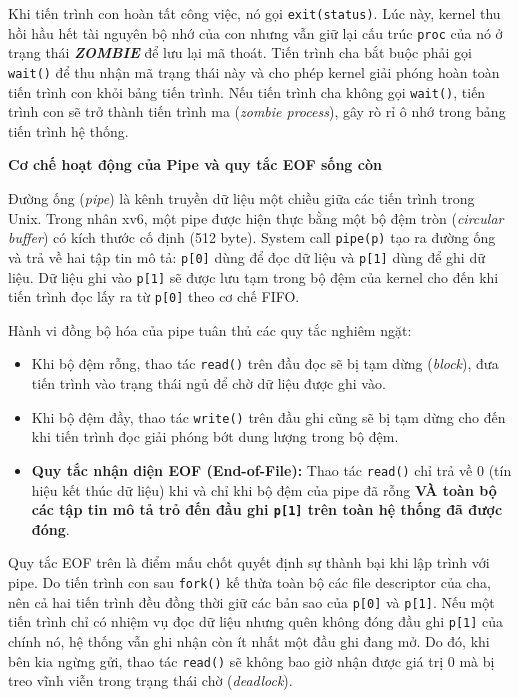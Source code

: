 \documentclass[12pt,a4paper]{article}
\begin{document}
Khi tiến trình con hoàn tất công việc, nó gọi \texttt{exit(status)}. Lúc này, kernel thu hồi hầu hết tài nguyên bộ nhớ của con nhưng vẫn giữ lại cấu trúc \texttt{proc} của nó ở trạng thái \textbf{\textit{ZOMBIE}} để lưu lại mã thoát. Tiến trình cha bắt buộc phải gọi \texttt{wait()} để thu nhận mã trạng thái này và cho phép kernel giải phóng hoàn toàn tiến trình con khỏi bảng tiến trình. Nếu tiến trình cha không gọi \texttt{wait()}, tiến trình con sẽ trở thành tiến trình ma (\textit{zombie process}), gây rò rỉ ô nhớ trong bảng tiến trình hệ thống.

\textbf{Cơ chế hoạt động của Pipe và quy tắc EOF sống còn}

Đường ống (\textit{pipe}) là kênh truyền dữ liệu một chiều giữa các tiến trình trong Unix. Trong nhân xv6, một pipe được hiện thực bằng một bộ đệm tròn (\textit{circular buffer}) có kích thước cố định (512 byte). System call \texttt{pipe(p)} tạo ra đường ống và trả về hai tập tin mô tả: \texttt{p[0]} dùng để đọc dữ liệu và \texttt{p[1]} dùng để ghi dữ liệu. Dữ liệu ghi vào \texttt{p[1]} sẽ được lưu tạm trong bộ đệm của kernel cho đến khi tiến trình đọc lấy ra từ \texttt{p[0]} theo cơ chế FIFO.

Hành vi đồng bộ hóa của pipe tuân thủ các quy tắc nghiêm ngặt:
\begin{itemize}
  \item Khi bộ đệm rỗng, thao tác \texttt{read()} trên đầu đọc sẽ bị tạm dừng (\textit{block}), đưa tiến trình vào trạng thái ngủ để chờ dữ liệu được ghi vào.
  \item Khi bộ đệm đầy, thao tác \texttt{write()} trên đầu ghi cũng sẽ bị tạm dừng cho đến khi tiến trình đọc giải phóng bớt dung lượng trong bộ đệm.
  \item \textbf{Quy tắc nhận diện EOF (End-of-File):} Thao tác \texttt{read()} chỉ trả về $0$ (tín hiệu kết thúc dữ liệu) khi và chỉ khi bộ đệm của pipe đã rỗng \textbf{VÀ toàn bộ các tập tin mô tả trỏ đến đầu ghi \texttt{p[1]} trên toàn hệ thống đã được đóng}.
\end{itemize}

Quy tắc EOF trên là điểm mấu chốt quyết định sự thành bại khi lập trình với pipe. Do tiến trình con sau \texttt{fork()} kế thừa toàn bộ các file descriptor của cha, nên cả hai tiến trình đều đồng thời giữ các bản sao của \texttt{p[0]} và \texttt{p[1]}. Nếu một tiến trình chỉ có nhiệm vụ đọc dữ liệu nhưng quên không đóng đầu ghi \texttt{p[1]} của chính nó, hệ thống vẫn ghi nhận còn ít nhất một đầu ghi đang mở. Do đó, khi bên kia ngừng gửi, thao tác \texttt{read()} sẽ không bao giờ nhận được giá trị $0$ mà bị treo vĩnh viễn trong trạng thái chờ (\textit{deadlock}).
\end{document}
